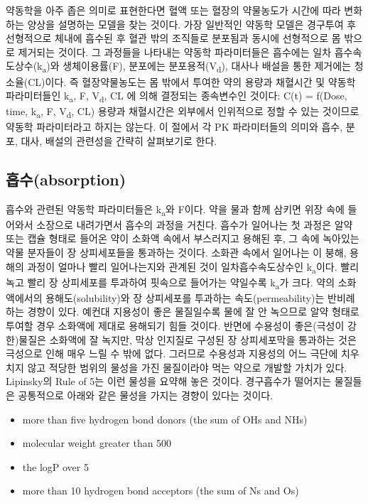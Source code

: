 \documentclass[
  11pt,
  krantz2, a4paper, twoside]{krantz}
\providecommand{\tightlist}{%
  \setlength{\itemsep}{0pt}\setlength{\parskip}{0pt}}
\theoremstyle{definition}
\theoremstyle{definition}
\theoremstyle{definition}
\theoremstyle{definition}
\theoremstyle{remark}
\begin{document}
약동학을 아주 좁은 의미로 표현한다면 혈액 또는 혈장의 약물농도가 시간에
따라 변화하는 양상을 설명하는 모델을 찾는 것이다. 가장 일반적인 약동학
모델은 경구투여 후 선형적으로 체내에 흡수된 후 혈관 밖의 조직들로 분포됨과 동시에 선형적으로 몸 밖으로 제거되는 것이다. 그 과정들을 나타내는 약동학
파라미터들은 흡수에는 일차 흡수속도상수(k\textsubscript{a})와 생체이용률(F), 분포에는
분포용적(V\textsubscript{d}), 대사나 배설을 통한 제거에는 청소율(CL)이다. 즉
혈장약물농도는 몸 밖에서 투여한 약의 용량과 채혈시간 및 약동학
파라미터들인 k\textsubscript{a}, F, V\textsubscript{d}, CL 에 의해 결정되는 종속변수인 것이다: C(t) =
f(Dose, time, k\textsubscript{a}, F, V\textsubscript{d}, CL) 용량과 채혈시간은 외부에서 인위적으로 정할
수 있는 것이므로 약동학 파라미터라고 하지는 않는다. 이 절에서 각 PK
파라미터들의 의미와 흡수, 분포, 대사, 배설의 관련성을 간략히 살펴보기로 한다.

\hypertarget{uxd761uxc218absorption}{%
\subsection{흡수(absorption)}\label{uxd761uxc218absorption}}

흡수와 관련된 약동학 파라미터들은 k\textsubscript{a}와 F이다. 약을 물과 함께 삼키면 위장 속에 들어와서 소장으로 내려가면서 흡수의 과정을 거친다.
흡수가 일어나는 첫 과정은 알약 또는 캡슐 형태로 들어온 약이 소화액 속에서 부스러지고 용해된 후, 그 속에 녹아있는 약물 분자들이 장 상피세포들을 통과하는 것이다.
소화관 속에서 일어나는 이 붕해, 용해의 과정이 얼마나 빨리 일어나는지와 관계된 것이 일차흡수속도상수인 k\textsubscript{a}이다.
빨리 녹고 빨리 장 상피세포를 투과하여 핏속으로 들어가는 약일수록 k\textsubscript{a}가 크다.
약의 소화액에서의 용해도(solubility)와 장 상피세포를 투과하는 속도(permeability)는 반비례하는 경향이 있다.
예컨대 지용성이 좋은 물질일수록 물에 잘 안 녹으므로 알약 형태로 투여할 경우 소화액에 제대로 용해되기 힘들 것이다.
반면에 수용성이 좋은(극성이 강한)물질은 소화액에 잘 녹지만, 막상 인지질로 구성된 장 상피세포막을 통과하는 것은 극성으로 인해 매우 느릴 수 밖에 없다.
그러므로 수용성과 지용성의 어느 극단에 치우치지 않고 적당한 범위의 물성을 가진 물질이라야 먹는 약으로 개발할 가치가 있다.
Lipinsky의 Rule of 5는 이런 물성을 요약해 놓은 것이다.
경구흡수가 떨어지는 물질들은 공통적으로 아래와 같은 물성을 가지는 경향이 있다는 것이다.

\begin{itemize}
\tightlist
\item
  more than five hydrogen bond donors (the sum of OHs and NHs)
\item
  molecular weight greater than 500
\item
  the logP over 5
\item
  more than 10 hydrogen bond acceptors (the sum of Ns and Os)
\end{itemize}
\end{document}
